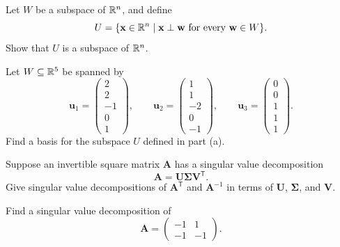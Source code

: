 \documentclass[11pt,oneside]{article}
\begin{document}
\begin{problem}
\begin{problemsubparts}
\item Let $W$ be a subspace of $\mathbb{R}^n$, and define
\[
U=\{\mathbf x\in\mathbb{R}^n\mid \mathbf x\perp\mathbf w\text{ for every }\mathbf w\in W\}.
\]
Show that $U$ is a subspace of $\mathbb{R}^n$.
\item Let $W\subseteq\mathbb{R}^5$ be spanned by
\[
\mathbf u_1=
\begin{pmatrix}2\\2\\-1\\0\\1\end{pmatrix},
\qquad
\mathbf u_2=
\begin{pmatrix}1\\1\\-2\\0\\-1\end{pmatrix},
\qquad
\mathbf u_3=
\begin{pmatrix}0\\0\\1\\1\\1\end{pmatrix}.
\]
Find a basis for the subspace $U$ defined in part \textup{(a)}.
\end{problemsubparts}
\end{problem}

\begin{problem}
Suppose an invertible square matrix $\mathbf A$ has a singular value decomposition
\[
\mathbf A=\mathbf U\boldsymbol\Sigma\mathbf V^{\mathsf T}.
\]
Give singular value decompositions of $\mathbf A^{\mathsf T}$ and $\mathbf A^{-1}$ in terms of $\mathbf U$, $\boldsymbol\Sigma$, and $\mathbf V$.
\end{problem}

\begin{problem}
Find a singular value decomposition of
\[
\mathbf A=
\begin{pmatrix}
-1&1\\
-1&-1
\end{pmatrix}.
\]
\end{problem}
\end{document}
